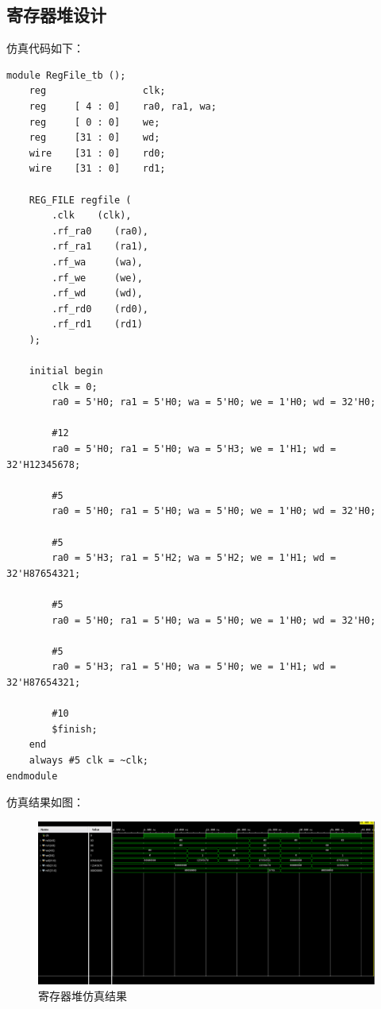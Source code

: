 \documentclass[12pt,a4paper]{ctexart}
\begin{document}
\subsection{寄存器堆设计}
仿真代码如下：
\begin{lstlisting}[style=verilog]
module RegFile_tb ();
    reg                 clk;
    reg     [ 4 : 0]    ra0, ra1, wa;
    reg     [ 0 : 0]    we;
    reg     [31 : 0]    wd;
    wire    [31 : 0]    rd0;
    wire    [31 : 0]    rd1;

    REG_FILE regfile (
        .clk    (clk),
        .rf_ra0    (ra0),
        .rf_ra1    (ra1),
        .rf_wa     (wa),
        .rf_we     (we),
        .rf_wd     (wd),
        .rf_rd0    (rd0),
        .rf_rd1    (rd1)
    );

    initial begin
        clk = 0;
        ra0 = 5'H0; ra1 = 5'H0; wa = 5'H0; we = 1'H0; wd = 32'H0;

        #12
        ra0 = 5'H0; ra1 = 5'H0; wa = 5'H3; we = 1'H1; wd = 32'H12345678;

        #5
        ra0 = 5'H0; ra1 = 5'H0; wa = 5'H0; we = 1'H0; wd = 32'H0;

        #5
        ra0 = 5'H3; ra1 = 5'H2; wa = 5'H2; we = 1'H1; wd = 32'H87654321;

        #5
        ra0 = 5'H0; ra1 = 5'H0; wa = 5'H0; we = 1'H0; wd = 32'H0;

        #5
        ra0 = 5'H3; ra1 = 5'H0; wa = 5'H0; we = 1'H1; wd = 32'H87654321;

        #10
        $finish;
    end
    always #5 clk = ~clk;
endmodule
\end{lstlisting}
仿真结果如图：
\begin{center}
    \begin{figure}[ht]
        \includegraphics[scale=0.35]{pic/2024-04-03_23-55.png}
        \caption{寄存器堆仿真结果}
    \end{figure}
\end{center}
\newpage
\end{document}
